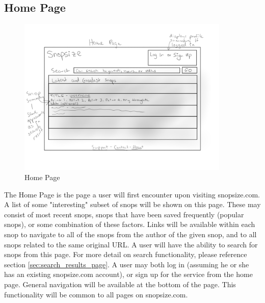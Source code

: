 \documentclass[11pt]{article}
\begin{document}
\subsection{Home Page}
\begin{figure}[htb]
\begin{center}
\includegraphics[width=0.9\textwidth]{home_page.png}
\caption{Home Page}
\label{fig:fig_home_page}
\end{center}
\end{figure}
The Home Page is the page a user will first encounter upon visiting snopsize.com. A list of some "interesting" subset of snops will be shown on this page. These may consist of most recent snops, snops that have been saved frequently (popular snops), or some combination of these factors. Links will be available within each snop to navigate to all of the snops from the author of the given snop, and to all snops related to the same original URL. A user will have the ability to search for snops from this page. For more detail on search functionality, please reference section \ref{sec:search_results_page}. A user may both log in (assuming he or she has an existing snopsize.com account), or sign up for the service from the home page. General navigation will be available at the bottom of the page. This functionality will be common to all pages on snopsize.com.
\end{document}
